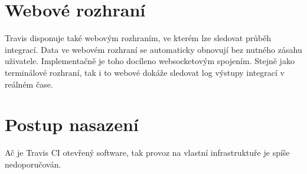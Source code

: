 \section{Webové rozhraní}

Travis disponuje také webovým rozhraním, ve kterém lze sledovat průběh integrací.
Data ve webovém rozhraní se automaticky obnovují bez nutného zásahu uživatele.
Implementačně je toho docíleno websocketovým spojením.
Stejně jako terminálové rozhraní, tak i to webové dokáže sledovat log výstupy integrací v reálném čase.

\section{Postup nasazení}

Ač je Travis CI otevřený software, tak provoz na vlastní infrastruktuře je spíše nedoporučován.
